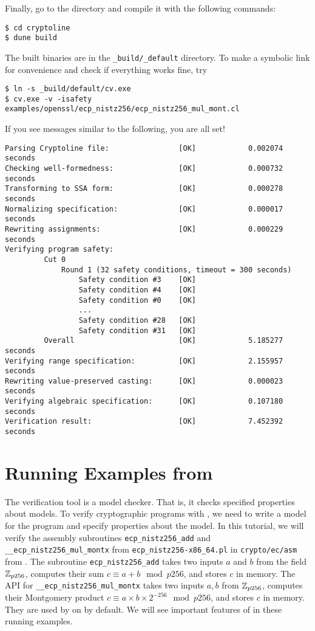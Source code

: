 \documentclass{amsproc}
\begin{document}
Finally, go to the \cryptoline directory and compile it with the
following commands:
\begin{verbatim}
$ cd cryptoline
$ dune build
\end{verbatim}

The built \cryptoline binaries are in the \texttt{\_build/\_default}
directory. To make a symbolic link for convenience and check if
everything works fine, try
\begin{verbatim}
$ ln -s _build/default/cv.exe
$ cv.exe -v -isafety examples/openssl/ecp_nistz256/ecp_nistz256_mul_mont.cl
\end{verbatim}

If you see messages similar to the following, you are all set!
\begin{verbatim}
Parsing Cryptoline file:                [OK]            0.002074 seconds
Checking well-formedness:               [OK]            0.000732 seconds
Transforming to SSA form:               [OK]            0.000278 seconds
Normalizing specification:              [OK]            0.000017 seconds
Rewriting assignments:                  [OK]            0.000229 seconds
Verifying program safety:
         Cut 0
             Round 1 (32 safety conditions, timeout = 300 seconds)
                 Safety condition #3    [OK]
                 Safety condition #4    [OK]
                 Safety condition #0    [OK]
                 ...
                 Safety condition #28   [OK]
                 Safety condition #31   [OK]
         Overall                        [OK]            5.185277 seconds
Verifying range specification:          [OK]            2.155957 seconds
Rewriting value-preserved casting:      [OK]            0.000023 seconds
Verifying algebraic specification:      [OK]            0.107180 seconds
Verification result:                    [OK]            7.452392 seconds 
\end{verbatim}

\section{Running Examples from \openssl}

The \cryptoline verification tool is a model checker. That is, it
checks specified properties about models. To verify cryptographic
programs with \cryptoline, we need to write a model for the program
and specify properties about the model. In this tutorial, we will
verify the \xeightysix assembly subroutines \texttt{ecp\_nistz256\_add}
and \texttt{\_\_ecp\_nistz256\_mul\_montx} from
\texttt{ecp\_nistz256-x86\_64.pl} in \texttt{crypto/ec/asm} from
\openssl. The subroutine \texttt{ecp\_nistz256\_add} takes two inputs
$a$ and $b$ from the field $\mathbb{Z}_{p256}$, computes their sum $c \equiv
a + b \mod p256$, and stores $c$ in memory. The API for
\texttt{\_\_ecp\_nistz256\_mul\_montx} takes two inputs $a, b$ from
$\mathbb{Z}_{p256}$, computes their Montgomery product $c \equiv a \times b
\times 2^{-256} \mod p256$, and stores $c$ in memory. They are used by
\openssl on \xeightysix by default. We will see important features of
\cryptoline in these running examples.
\end{document}
